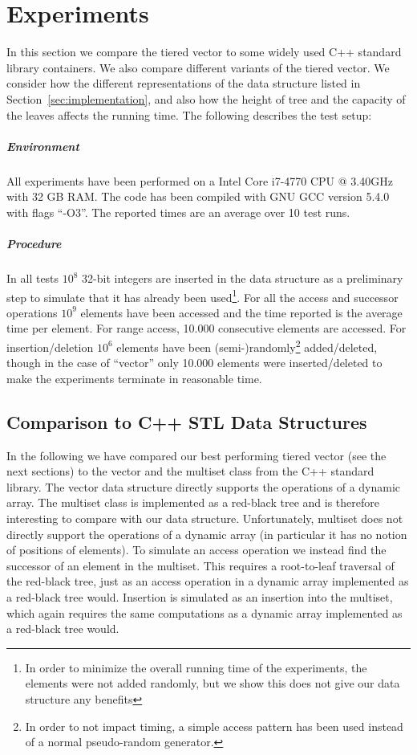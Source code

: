 \section{Experiments}

\label{sec:experiments}
In this section we compare the tiered vector to some widely used C++ standard library containers. 
We also compare different variants of the tiered vector. 
We consider how the different representations of the data
structure listed in Section~\ref{sec:implementation}, 
and also how the height of tree and the capacity of the leaves affects the running time.
The following describes the test setup:

\subparagraph{Environment}

All experiments have been performed on a Intel Core i7-4770 CPU @ 3.40GHz with
32 GB RAM. The code has been compiled with GNU GCC version 5.4.0 with flags
``-O3''. The reported times are an average over 10 test runs.
 
 \subparagraph{Procedure}
 
In all tests $10^8$ 32-bit integers 
are inserted in the data structure as a preliminary step
to simulate that it has already been
used\footnote{In order to minimize the overall running time of the experiments,
the elements were not added randomly, but we show this does not give our data
structure any benefits}.
For all the access and successor operations $10^9$ elements have been accessed
and the time reported is the average time per element.
For range access, 10.000 consecutive elements are accessed.
For insertion/deletion $10^6$ elements
have been (semi-)randomly\footnote{In order to not impact timing, a simple
access pattern has been used instead of a normal pseudo-random generator.}
added/deleted, though in the case of ``vector'' only 10.000 elements were
inserted/deleted to make the experiments terminate in reasonable time. 

\subsection{Comparison to C++ STL Data Structures}

In the following we have compared our best performing tiered vector (see the next sections) to the vector and
the multiset class from the C++ standard library.
The vector data structure directly supports the
operations of a dynamic array. The multiset class is implemented as a red-black
tree and is therefore interesting to compare with our data structure.
Unfortunately, multiset does not directly support the operations of a dynamic
array (in particular it has no notion of positions of elements). To simulate an
access operation we instead find the successor of an element in the multiset.
This requires a root-to-leaf traversal of the red-black tree, just as an access
operation in a dynamic array implemented as a red-black tree would. Insertion
is simulated as an insertion into the multiset, which again requires the same
computations as a dynamic array implemented as a red-black tree would.

